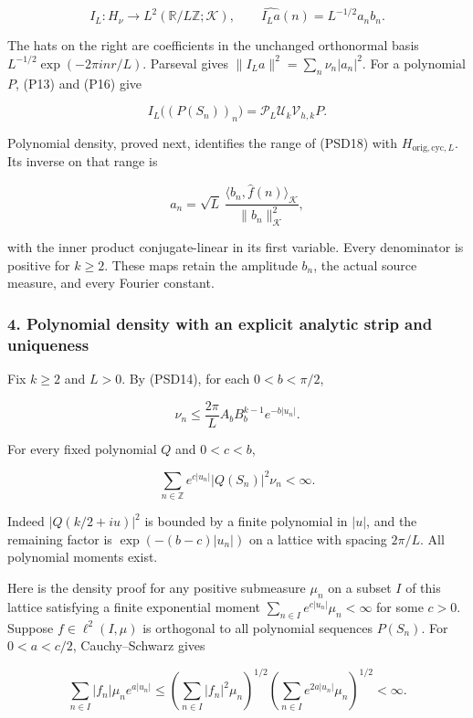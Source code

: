 \[
I_L:H_\nu\longrightarrow L^2(\mathbb R/L\mathbb Z;\mathcal K),
\qquad \widehat{I_La}(n)=L^{-1/2}a_nb_n.
\tag{PSD18}
\]

The hats on the right are coefficients in the unchanged orthonormal basis \(L^{-1/2}\exp(-2\pi i nr/L)\). Parseval gives \(\|I_La\|^2=\sum_n\nu_n|a_n|^2\). For a polynomial \(P\), (P13) and (P16) give

\[
I_L\bigl((P(S_n))_n\bigr)
=\mathcal P_L\mathcal U_k\mathcal V_{h,k}P.
\tag{PSD19}
\]

Polynomial density, proved next, identifies the range of (PSD18) with \(H_{\mathrm{orig,cyc},L}\). Its inverse on that range is

\[
a_n=\sqrt L\,
\frac{\langle b_n,\widehat f(n)\rangle_{\mathcal K}}{\|b_n\|_{\mathcal K}^2},
\tag{PSD20}
\]

with the inner product conjugate-linear in its first variable. Every denominator is positive for \(k\ge 2\). These maps retain the amplitude \(b_n\), the actual source measure, and every Fourier constant.

\subsubsection{4. Polynomial density with an explicit analytic strip and uniqueness}\label{polynomial-density-with-an-explicit-analytic-strip-and-uniqueness}

Fix \(k\ge 2\) and \(L>0\). By (PSD14), for each \(0<b<\pi/2\),

\[
\nu_n\le\frac{2\pi}{L}A_bB_b^{k-1}e^{-b|u_n|}.
\tag{PSD21}
\]

For every fixed polynomial \(Q\) and \(0<c<b\),

\[
\sum_{n\in\mathbb Z}e^{c|u_n|}|Q(S_n)|^2\nu_n<\infty.
\tag{PSD22}
\]

Indeed \(|Q(k/2+iu)|^2\) is bounded by a finite polynomial in \(|u|\), and the remaining factor is \(\exp(-(b-c)|u_n|)\) on a lattice with spacing \(2\pi/L\). All polynomial moments exist.

Here is the density proof for any positive submeasure \(\mu_n\) on a subset \(I\) of this lattice satisfying a finite exponential moment \(\sum_{n\in I}e^{c|u_n|}\mu_n<\infty\) for some \(c>0\). Suppose \(f\in\ell^2(I,\mu)\) is orthogonal to all polynomial sequences \(P(S_n)\). For \(0<a<c/2\), Cauchy--Schwarz gives

\[
\sum_{n\in I}|f_n|\mu_ne^{a|u_n|}
\le\left(\sum_{n\in I}|f_n|^2\mu_n\right)^{1/2}
\left(\sum_{n\in I}e^{2a|u_n|}\mu_n\right)^{1/2}<\infty.
\tag{PSD23}
\]

